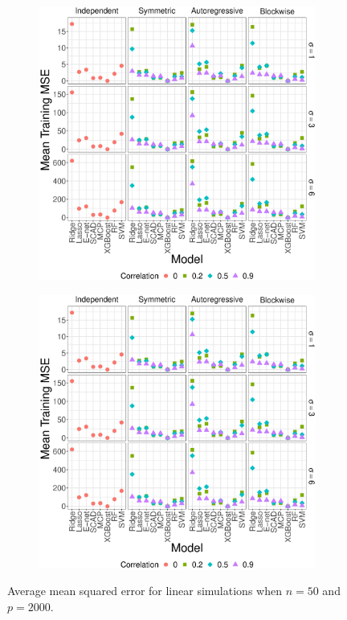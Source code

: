 \documentclass{article}
\begin{document}
	\begin{figure}[!htb]
		\centering
		\begin{subfigure}[b]{0.47\textwidth}
			\includegraphics[width=\textwidth]{images/facet/publication_facet_train_mse_linear_50_2000.eps}
			\label{fig:linear-test-mse}
		\end{subfigure}
		\hspace{6pt}
		\begin{subfigure}[b]{0.47\textwidth}
			\includegraphics[width=\textwidth]{images/facet/publication_facet_train_mse_linear_50_2000.eps}
			\label{fig:linear-train-mse}
		\end{subfigure}
		\caption{Average mean squared error for linear simulations when $n = 50$ and $p = 2000$.}
		\label{fig:linear-mse}
	\end{figure}
\end{document}
